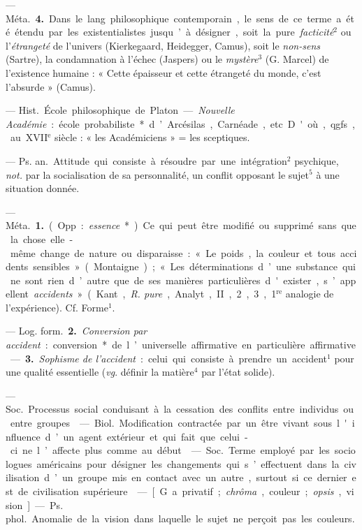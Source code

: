 \begin{itemize}[leftmargin=1cm, label=, itemsep=1pt]
— \si{Méta.} {\bf 4.} Dans le lang. philosophique contemporain, le sens de
ce terme a été étendu par les existentialistes jusqu’à désigner, soit la
pure {\it facticité}$^2$ ou l'{\it étrangeté} de l'univers (Kierkegaard, Heidegger, Camus),
soit le {\it non-sens} (Sartre), la
condamnation à l'échec (Jaspers) ou
le {\it mystère}$^3$ (G. Marcel) de l'existence
humaine : « Cette épaisseur et cette
étrangeté du monde, c’est l'absurde »
(Camus).

 — \si{Hist.} École philosophique de Platon.
— {\it Nouvelle Académie} :
école probabiliste* d’Arcésilas, Carnéade, etc. D'où, qgfs., au
{\footnotesize XVII}$^\text{e}$ siècle : « les Académiciens »
= les sceptiques.

 — \si{Ps. an.} Attitude qui
consiste à résoudre par une intégration$^2$ psychique, {\it not.} par la socialisation
de sa personnalité, un conflit
opposant le sujet$^5$ à une situation
donnée.

 — \si{Méta.} {\bf 1.} (Opp. : {\it essence}*).
Ce qui peut être modifié ou supprimé sans que la chose elle-même
change de nature ou disparaisse :
« Le poids, la couleur et tous accidents sensibles » (Montaigne); « Les
déterminations d’une substance qui
ne sont rien d’autre que de ses manières particulières d'exister,
s’appellent {\it accidents} » (Kant, {\it R. pure},
Analyt., II, 2, 3, 1$^\text{re}$ analogie de l’expérience). Cf. {\it }Forme$^1$.

— \si{Log. form.} {\bf 2.} {\it Conversion par
accident} : conversion* de l’universelle affirmative en particulière
affirmative. — {\bf 3.} {\it Sophisme de l’accident} : celui qui consiste à prendre
un accident$^1$ pour une qualité essentielle ({\it vg}. définir la matière$^4$ par
l’état solide).

 — \si{Soc.} Processus
social conduisant à la cessation des
conflits entre individus ou entre
groupes.

 — \si{Biol.} Modification
contractée par un être vivant sous
l'influence d’un agent extérieur et
qui fait que celui-ci ne l’affecte plus
comme au début.

 — \si{Soc.} Terme employé
par les sociologues américains pour
désigner les changements qui s’effectuent dans la civilisation d’un groupe
mis en contact avec un autre, surtout si ce dernier est de civilisation
supérieure.

 — [G. a privatif; {\it chrôma},
couleur; {\it opsis}, vision] — \si{Ps. phol.}
Anomalie de la vision dans laquelle
le sujet ne perçoit pas les couleurs.


\end{itemize}
